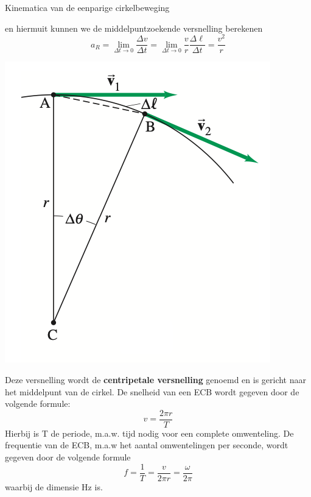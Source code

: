 \begin{theo}{Kinematica van de eenparige cirkelbeweging}
\begin{minipage}{.71\textwidth}
        \noindent en hiermuit kunnen we de middelpuntzoekende versnelling berekenen
        \begin{equation*}
            a_R = \lim_{\Delta t \to 0} \frac{\Delta v}{\Delta t} = \lim_{\Delta t \to 0} \frac{v}{r}\frac{\Delta \ell}{\Delta t} = \frac{v^2}{r}
        \end{equation*}
    \end{minipage} 
    \begin{minipage}{.25\textwidth}
        \includegraphics[scale = 0.3]{Images/Dynamica/Kinematica van de Cirkelbeweging.png}      
    \end{minipage}
    \vspace{0.3cm}

    \noindent Deze versnelling wordt de \textbf{centripetale versnelling} genoemd en is gericht naar het middelpunt van de cirkel. De snelheid van een ECB wordt gegeven door de volgende formule: 
    \begin{equation*}
        v = \frac{2\pi r}{T}
    \end{equation*}
    \noindent Hierbij is T de periode, m.a.w. tijd nodig voor een complete omwenteling. De frequentie van de ECB, m.a.w het aantal omwentelingen per seconde, wordt gegeven door de volgende formule
    \begin{equation*}
        f = \frac{1}{T} = \frac{v}{2\pi r} = \frac{\omega}{2\pi}
    \end{equation*}
    waarbij de dimensie Hz is.
\end{theo}

